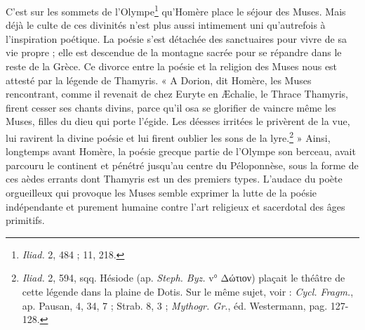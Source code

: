\documentclass[landscape, a4paper, 11pt, oneside, polutonikogreek, french]{article}
\begin{document}
C'est sur les sommets de l'Olympe\footnote{\emph{Iliad.} 2, 484 ; 11, 218.} qu'Homère place le séjour des Muses. Mais déjà le culte de ces divinités n'est plus aussi intimement uni qu'autrefois à l'inspiration poétique. La poésie s'est détachée des sanctuaires pour vivre de sa vie propre ; elle est descendue de la montagne sacrée pour se répandre dans le reste de la Grèce. Ce divorce entre la poésie et la religion des Muses nous est attesté par la légende de Thamyris. « A Dorion, dit Homère, les Muses rencontrant, comme il revenait de chez Euryte en Æchalie, le Thrace Thamyris, firent cesser ses chants divins, parce qu'il osa se glorifier de vaincre même les Muses, filles du dieu qui porte l'égide. Les déesses irritées le privèrent de la vue, lui ravirent la divine poésie et lui firent oublier les sons de la lyre.\footnote{\emph{Iliad.} 2, 594, sqq. Hésiode (ap. \emph{Steph. Byz.} v° Δώτιον) plaçait le théâtre de cette légende dans la plaine de Dotis. Sur le même sujet, voir : \emph{Cycl. Fragm.}, ap. Pausan, 4, 34, 7 ; Strab. 8, 3 ; \emph{Mythogr. Gr.}, éd. Westermann, pag. 127-128.} » Ainsi, longtemps avant Homère, la poésie grecque partie de l'Olympe son berceau, avait parcouru le continent et pénétré jusqu'au centre du Péloponnèse, sous la forme de ces aèdes errants dont Thamyris est un des premiers types. L'audace du poète orgueilleux qui provoque les Muses semble exprimer la lutte de la poésie indépendante et purement humaine contre l'art religieux et sacerdotal des âges primitifs.
\end{document}
